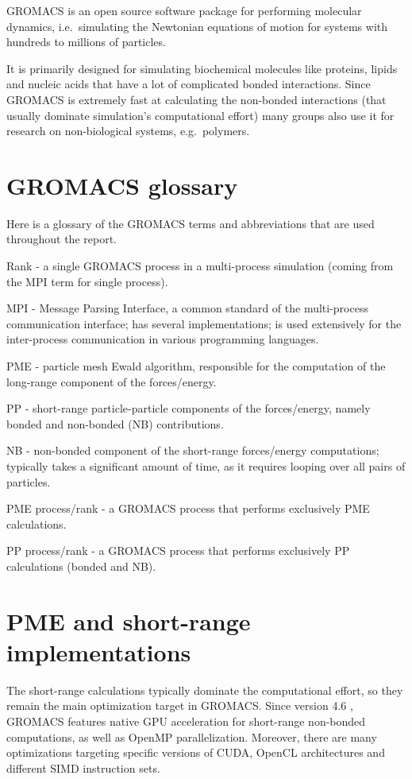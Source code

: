 \documentclass[12pt,a4paper]{report}
\newcommand{\draft}[1]{#1}
\begin{document}
GROMACS \cite{gromacshome} is an open source software package for performing molecular dynamics, i.e.~simulating the Newtonian equations of motion for systems with hundreds to millions of particles. 

It is primarily designed for simulating biochemical molecules like proteins, lipids and nucleic acids that have a lot of complicated bonded interactions. Since GROMACS is extremely fast at calculating the non-bonded interactions (that usually dominate simulation's computational effort) many groups also use it for research on non-biological systems, e.g.~polymers.

\section{GROMACS glossary}
Here is a glossary of the GROMACS terms and abbreviations that are used throughout the report.

Rank - a single GROMACS process in a multi-process simulation (coming from the MPI term for single process).

MPI - Message Parsing Interface, a common standard of the multi-process communication interface; has several implementations; is used extensively for the inter-process communication in various programming languages.

PME - particle mesh Ewald algorithm, responsible for the computation of the long-range component of the forces/energy.

PP - short-range particle-particle components of the forces/energy, namely bonded and non-bonded (NB) contributions.

NB - non-bonded component of the short-range forces/energy computations; typically takes a significant amount of time, as it requires looping over all pairs of particles. 

PME process/rank - a GROMACS process that performs exclusively PME calculations.

PP process/rank - a GROMACS process that performs exclusively PP calculations (bonded and NB).  


\section{PME and short-range implementations} \label{rangeimpl}

The short-range calculations typically dominate the computational effort, so they remain the main optimization target in GROMACS. Since version 4.6 \cite{gromacs46}, GROMACS features native GPU acceleration for short-range non-bonded computations, as well as OpenMP parallelization. Moreover, there are many optimizations targeting specific versions of CUDA, OpenCL architectures and different SIMD instruction sets. 
\end{document}
